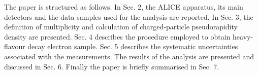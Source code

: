 The paper is structured as follows. In Sec. 2, the
ALICE apparatus, its main detectors and the data samples used for the analysis are reported. In Sec. 3, the definition of multiplicity and calculation of charged-particle pseudorapidity density are presented. Sec. 4 describes the procedure employed to obtain heavy-flavour decay electron sample. Sec. 5 describes the systematic uncertainties associated with the measurements. The results of the analysis are presented and discussed in Sec. 6. Finally the paper is briefly summarised in Sec. 7.




